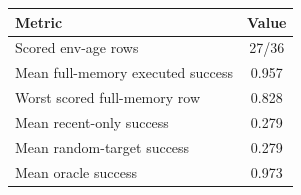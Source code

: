 \begin{tabular}{lc}
\toprule
Metric & Value\\
\midrule
Scored env-age rows & 27/36\\
Mean full-memory executed success & 0.957\\
Worst scored full-memory row & 0.828\\
Mean recent-only success & 0.279\\
Mean random-target success & 0.279\\
Mean oracle success & 0.973\\
\bottomrule
\end{tabular}
